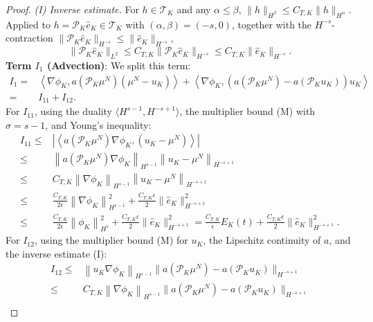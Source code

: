 \documentclass[a4paper,fleqn]{cas-sc}
\theoremstyle{definition}
\theoremstyle{remark}
\begin{document}
\begin{proof}
\emph{(I) Inverse estimate.} For $h\in\mathcal T_K$ and any $\alpha\le\beta$,
$\|h\|_{H^\beta}\le C_{T,K}\|h\|_{H^\alpha}$. Applied to
$h=\mathcal P_K\hat e_K\in\mathcal T_K$ with $(\alpha,\beta)=(-s,0)$, together with
the $H^{-s}$-contraction $\|\mathcal P_K\hat e_K\|_{H^{-s}}\le\|\hat e_K\|_{H^{-s}}$,
\[
\|\mathcal P_K\hat e_K\|_{L^2}
\le C_{T,K}\|\mathcal P_K\hat e_K\|_{H^{-s}}
\le C_{T,K}\|\hat e_K\|_{H^{-s}}.
\]
\textbf{Term $I_1$ (Advection)}: We split this term: 
\begin{equation}
    \begin{aligned}
        I_1 
        = &  
         \left\langle \nabla  \phi_K,  a(\mathcal P_K \mu^N ) ( \mu^N - u_K )\right\rangle 
        +
        \left\langle \nabla  \phi_K,  \left( a(\mathcal P_K \mu^N) - a(\mathcal P_K u_K) \right) u_K \right\rangle \\
        =& I_{11} + I_{12}.
    \end{aligned}
\end{equation}
For $I_{11}$, using the duality $\langle H^{s-1}, H^{-s+1}\rangle$, the multiplier
bound (M) with $\sigma=s-1$, and Young's inequality:
\[
\begin{aligned}
    I_{11}
        \leq & 
        \left|\left\langle a(\mathcal P_K \mu^N)  \nabla  \phi_K,   (u_K - \mu^N )\right\rangle\right|\\
        \leq& \left\|a(\mathcal P_K \mu^N)  \nabla  \phi_K\right\|_{H^{s-1}} \left\|u_K - \mu^N \right\|_{H^{-s+1}} \\
        \leq& C_{T,K} \left\|\nabla  \phi_K\right\|_{H^{s-1}} \left\|u_K - \mu^N \right\|_{H^{-s+1}} \\
        \leq& \frac{C_{T,K}}{2\epsilon}\left\|\nabla  \phi_K\right\|_{H^{s-1}}^2 + \frac{C_{T,K}\epsilon}{2}\|\hat{e}_K\|^2_{H^{-s+1}}\\
         \leq& \frac{C_{T,K}}{2\epsilon}\left\|  \phi_K\right\|_{H^{s}}^2 + \frac{C_{T,K}\epsilon}{2}\|\hat{e}_K\|^2_{H^{-s+1}}
        = \frac{C_{T,K}}{\epsilon} E_K(t)+ \frac{C_{T,K}\epsilon}{2}\|\hat{e}_K\|^2_{H^{-s+1}}.
\end{aligned}
\]
For $I_{12}$, using the multiplier bound (M) for $u_K$, the Lipschitz continuity of
$a$, and the inverse estimate (I):
\[
\begin{aligned}
     I_{12} \leq & \left\|u_K \nabla \phi_K\right\|_{H^{s-1}} \bigl\| a(\mathcal  P_K \mu^N) - a(\mathcal P_K u_K)\bigr\|_{H^{-s+1}}\\
     \leq&  C_{T,K}\left\|\nabla  \phi_K\right\|_{H^{s-1}} \bigl\| a(\mathcal  P_K \mu^N) - a(\mathcal P_K u_K)\bigr\|_{H^{-s+1}}\\

\end{aligned}\]
\end{proof}
\end{document}

